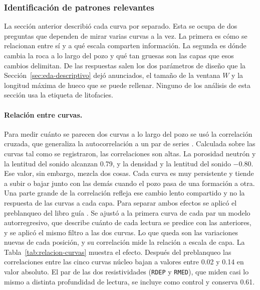 \documentclass[11pt,a4paper]{article}
\begin{document}
\subsubsection{Identificación de patrones relevantes}
\label{sec:eda-patrones}

La sección anterior describió cada curva por separado. Esta se ocupa de dos preguntas que dependen de mirar varias curvas a la vez. La primera es cómo se relacionan entre sí y a qué escala comparten información. La segunda es dónde cambia la roca a lo largo del pozo y qué tan gruesas son las capas que esos cambios delimitan. De las respuestas salen los dos parámetros de diseño que la Sección~\ref{sec:eda-descriptivo} dejó anunciados, el tamaño de la ventana $W$ y la longitud máxima de hueco que se puede rellenar. Ninguno de los análisis de esta sección usa la etiqueta de litofacies.

\paragraph{Relación entre curvas.} Para medir cuánto se parecen dos curvas a lo largo del pozo se usó la correlación cruzada, que generaliza la autocorrelación a un par de series \cite{shumway2011}. Calculada sobre las curvas tal como se registraron, las correlaciones son altas. La porosidad neutrón y la lentitud del sonido alcanzan 0.79, y la densidad y la lentitud del sonido $-0.80$. Ese valor, sin embargo, mezcla dos cosas. Cada curva es muy persistente y tiende a subir o bajar junto con las demás cuando el pozo pasa de una formación a otra. Una parte grande de la correlación refleja ese cambio lento compartido y no la respuesta de las curvas a cada capa. Para separar ambos efectos se aplicó el preblanqueo del libro guía \cite[Ej.~5.7]{shumway2011}. Se ajustó a la primera curva de cada par un modelo autorregresivo, que describe cuánto de cada lectura se predice con las anteriores, y se aplicó el mismo filtro a las dos curvas. Lo que queda son las variaciones nuevas de cada posición, y su correlación mide la relación a escala de capa. La Tabla~\ref{tab:relacion-curvas} muestra el efecto. Después del preblanqueo las correlaciones entre las cinco curvas núcleo bajan a valores entre 0.02 y 0.14 en valor absoluto. El par de las dos resistividades (\texttt{RDEP} y \texttt{RMED}), que miden casi lo mismo a distinta profundidad de lectura, se incluye como control y conserva 0.61.
\end{document}
